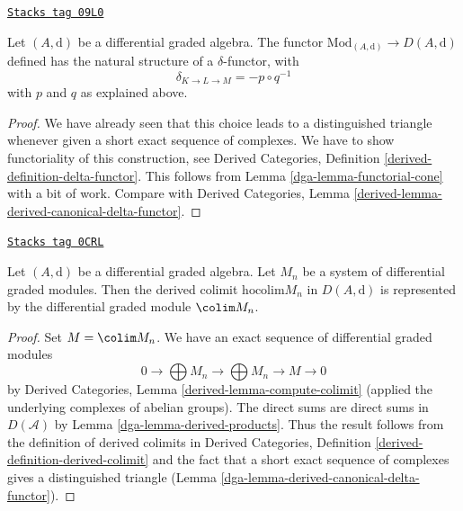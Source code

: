 \begin{lemma}
\label{dga-lemma-derived-canonical-delta-functor}
\href{https://stacks.math.columbia.edu/tag/09L0}{\texttt{Stacks tag 09L0}}

Let $(A, \text{d})$ be a differential graded algebra. The functor
$\text{Mod}_{(A, \text{d})} \to D(A, \text{d})$
defined has the natural structure of a $\delta$-functor, with
$$
\delta_{K \to L \to M} = - p \circ q^{-1}
$$
with $p$ and $q$ as explained above.
\end{lemma}

\begin{proof}

We have already seen that this choice leads to a distinguished
triangle whenever given a short exact sequence of complexes.
We have to show functoriality of this construction, see
Derived Categories, Definition \ref{derived-definition-delta-functor}.
This follows from Lemma \ref{dga-lemma-functorial-cone} with a bit of
work. Compare with
Derived Categories, Lemma \ref{derived-lemma-derived-canonical-delta-functor}.
\end{proof}

\begin{lemma}
\label{dga-lemma-homotopy-colimit}
\href{https://stacks.math.columbia.edu/tag/0CRL}{\texttt{Stacks tag 0CRL}}

Let $(A, \text{d})$ be a differential graded algebra. Let
$M_n$ be a system of differential graded modules. Then the derived
colimit $\text{hocolim} M_n$ in $D(A, \text{d})$ is represented
by the differential graded module $\colim M_n$.
\end{lemma}

\begin{proof}

Set $M = \colim M_n$. We have an exact sequence of differential graded modules
$$
0 \to \bigoplus M_n \to \bigoplus M_n \to M \to 0
$$
by Derived Categories, Lemma \ref{derived-lemma-compute-colimit}
(applied the underlying complexes of abelian groups).
The direct sums are direct sums in $D(\mathcal{A})$ by
Lemma \ref{dga-lemma-derived-products}.
Thus the result follows from the definition
of derived colimits in Derived Categories,
Definition \ref{derived-definition-derived-colimit}
and the fact that a short exact sequence of complexes
gives a distinguished triangle
(Lemma \ref{dga-lemma-derived-canonical-delta-functor}).
\end{proof}

